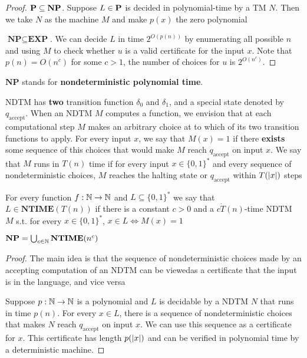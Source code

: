 \documentclass[11pt]{article}
\def \EXP {\textbf{EXP}}
\def \NTIME {\textbf{NTIME}}
\def \NP {\textbf{NP}}
\def \NP {\textbf{NP}}
\def \accept {\text{accept}}
\begin{document}
\begin{enumerate}
\begin{proof}
\(\bP\subseteq\NP\). Suppose \(L\in\operatorname{\textbf{P}}\) is decided in polynomial-time by a TM \(N\).
Then we take \(N\) as the machine \(M\) and make \(p(x)\) the zero polynomial

\(\NP\subseteq\EXP\). We can decide \(L\) in time \(2^{O(p(n))}\)  by enumerating all
possible \(n\) and using \(M\) to check whether \(u\) is a valid certificate for the
input \(x\). Note that \(p(n)=O(n^c)\) for some \(c>1\), the number of choices for \(u\) is \(2^{O(n^c)}\).
\end{proof}

\(\NP\) stands for \textbf{nondeterministic polynomial time}.

NDTM has \textbf{two} transition function \(\delta_0\) and \(\delta_1\), and a special state denoted
by \(q_{\accept}\). When an NDTM \(M\) computes a function, we envision that at each
computational step \(M\) makes an arbitrary choice at to which of its two transition functions
to apply. For every input \(x\), we say that \(M(x)=1\) if there \textbf{exists} some sequence of this
choices that would make \(M\) reach \(q_{\accept}\) on input \(x\). We say that \(M\) runs
in \(T(n)\) time if for every input \(x\in\{0,1\}^*\) and every sequence of nondeterministic
choices, \(M\) reaches the halting state or \(q_{\accept}\) within \(T(\abs{x})\) steps

\begin{definition}[]
For every function \(f:\mathbb{N}\to\mathbb{N}\) and \(L\subseteq\{0,1\}^*\) we say that \(L\in\NTIME(T(n))\)
if there is a constant \(c>0\) and a \(c\dot T(n)\)-time NDTM \(M\) s.t. for
every \(x\in\{0,1\}^*\), \(x\in L\Leftrightarrow M(x)=1\)
\end{definition}

\begin{theorem}[]
\(\NP=\bigcup_{c\in\N}\NTIME(n^c)\)
\end{theorem}

\begin{proof}
The main idea is that the sequence of nondeterministic choices made by an accepting computation
of an NDTM can be viewedas a certificate that the input is in the language, and vice versa

Suppose \(p:\mathbb{N}\to\mathbb{N}\) is a polynomial and \(L\) is decidable by a NDTM \(N\) that runs in
time \(p(n)\). For every \(x\in L\), there is a sequence of nondeterministic choices that
makes \(N\) reach \(q_{\accept}\) on input \(x\). We can use this sequence as a certificate
for \(x\). This certificate has length \(p(\abs{x})\) and can be verified in polynomial time by
a deterministic machine.


\end{proof}
\end{enumerate}
\end{document}
